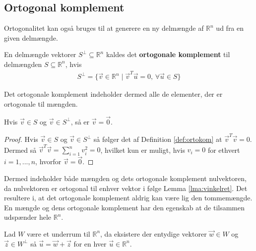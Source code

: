 \subsection{Ortogonal komplement}
Ortogonalitet kan også bruges til at generere en ny delmængde af $\mathds{R}^n$ ud fra en given delmængde.
\begin{defn}
En delmængde vektorer $S^{\bot} \subseteq \mathds{R}^n$ kaldes det \textbf{ortogonale komplement} til delmængden $S \subseteq \mathds{R}^n$, hvis 
\begin{align*}
	S^{\bot} = \{\vec{v} \in \mathds{R}^n \mid \vec{v}^T\vec{u} = 0, \, \forall \vec{u} \in S\}
\end{align*}
\label{def:ortokom}
\end{defn}
Det ortogonale komplement indeholder dermed alle de elementer, der er ortogonale til mængden.
\begin{prop}
Hvis $\vec{v} \in S$ og $\vec{v} \in S^{\bot}$, så er  $\vec{v}=\vec{0}$.
\label{prop:nulortokomp}
\end{prop}
\begin{proof}
Hvis $\vec{v} \in S$ og $\vec{v} \in S^{\bot}$ så følger det af Definition \ref{def:ortokom} at $\vec{v}^T\vec{v} = 0$.
Dermed så $\vec{v}^T\vec{v} = \sum_{i=1}^n v_i^2 =0$, hvilket kun er muligt, hvis $v_i = 0$ for ethvert $i = 1,..., n$, hvorfor $\vec{v}=\vec{0}$.
\end{proof}
Dermed indeholder både mængden og dets ortogonale komplement nulvektoren, da nulvektoren er ortogonal til enhver vektor i følge Lemma \ref{lma:vinkelret}. 
Det resultere i, at det ortogonale komplement aldrig kan være lig den tommemængde.
En mængde og dens ortogonale komplement har den egenskab at de tilsammen udspænder hele $\mathds{R}^n$.
\begin{stn}
Lad $W$ være et underrum til $\mathds{R}^n$, da eksistere der entydige vektorer  $\vec{w} \in W$ og $\vec{z} \in W^{\bot}$ så $\vec{u}= \vec{w}+\vec{z}$ for en hver $\vec{u} \in \mathds{R}^n$.
\label{stn:Rnorto}
\end{stn}
